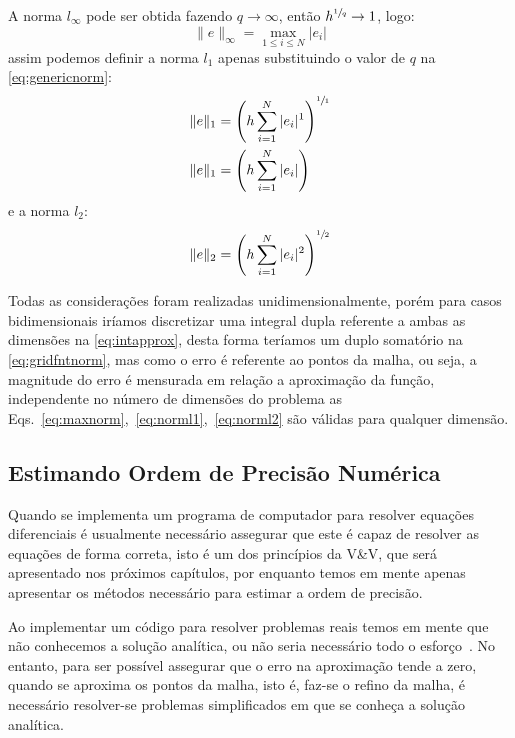 \documentclass[
	12pt,				  %
	openright,		%
	twoside,			%
	a4paper,			%
	chapter=TITLE,		    %
	english,			%
	brazil				%
	]{abntex2}
\begin{document}
A norma $l_\infty$ pode ser obtida fazendo $q \to \infty$,
então  $h^{\sfrac{1}{q}} \to 1$, logo:
\begin{equation}
    \|e\|_{\infty} = \max_{1\leq i \leq N} |e_i|
    \label{eq:maxnorm}
\end{equation}
assim podemos definir a norma $l_1$ apenas substituindo o valor de $q$ na
\autoref{eq:genericnorm}:
\begin{align}
    \|e\|_1 &= {\left( h\sum_{i=1}^{N} |e_i|^1 \right)}^{\sfrac{1}{1}}\nonumber\\
    \|e\|_1 &= {\left( h\sum_{i=1}^{N} |e_i| \right)}\label{eq:norml1}
\end{align}
e a norma $l_2$:
\begin{equation}
    \|e\|_2 = {\left( h\sum_{i=1}^{N} |e_i|^2 \right)}^{\sfrac{1}{2}}
    \label{eq:norml2}
\end{equation}

Todas as considerações foram realizadas unidimensionalmente, porém para casos
bidimensionais iríamos discretizar uma integral dupla referente a ambas as
dimensões na \autoref{eq:intapprox}, desta forma teríamos um duplo somatório na
\autoref{eq:gridfntnorm}, mas como o erro é referente ao pontos da malha, ou
seja, a magnitude do erro é mensurada em relação a aproximação da função,
independente no número de dimensões do problema as
Eqs.~\ref{eq:maxnorm},~\ref{eq:norml1},~\ref{eq:norml2} são válidas para
qualquer dimensão.

\subsection{Estimando Ordem de Precisão Numérica}\label{sec:orderprecision}

Quando se implementa um programa de computador para resolver equações
diferenciais é usualmente necessário assegurar que este é capaz de resolver as
equações de forma correta, isto é um dos princípios da V\&V, que será
apresentado nos próximos capítulos, por enquanto temos em mente apenas
apresentar os métodos necessário para estimar a ordem de precisão. 

Ao implementar um código para resolver problemas reais temos em mente que não
conhecemos a solução analítica, ou não seria necessário todo o
esforço~\cite{leveque2007}. No entanto, para ser possível assegurar que o erro
na aproximação tende a zero, quando se aproxima os pontos da malha, isto é,
faz-se o refino da malha, é necessário resolver-se problemas simplificados em
que se conheça a solução analítica. 
\end{document}
